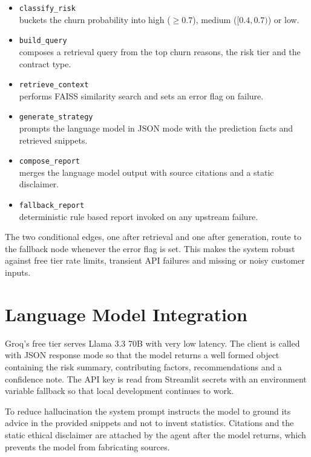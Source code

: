 \documentclass[conference]{IEEEtran}
\begin{document}
\begin{itemize}
    \setlength{\itemsep}{3pt}
    \item \texttt{classify\_risk} \\ buckets the churn probability into high (\(\geq 0.7\)), medium (\([0.4, 0.7)\)) or low.
    \item \texttt{build\_query} \\ composes a retrieval query from the top churn reasons, the risk tier and the contract type.
    \item \texttt{retrieve\_context} \\ performs FAISS similarity search and sets an error flag on failure.
    \item \texttt{generate\_strategy} \\ prompts the language model in JSON mode with the prediction facts and retrieved snippets.
    \item \texttt{compose\_report} \\ merges the language model output with source citations and a static disclaimer.
    \item \texttt{fallback\_report} \\ deterministic rule based report invoked on any upstream failure.
\end{itemize}

The two conditional edges, one after retrieval and one after generation, route to the fallback node whenever the error flag is set. This makes the system robust against free tier rate limits, transient API failures and missing or noisy customer inputs.

\section{Language Model Integration}
Groq's free tier serves Llama 3.3 70B with very low latency. The client is called with JSON response mode so that the model returns a well formed object containing the risk summary, contributing factors, recommendations and a confidence note. The API key is read from Streamlit secrets with an environment variable fallback so that local development continues to work.

To reduce hallucination the system prompt instructs the model to ground its advice in the provided snippets and not to invent statistics. Citations and the static ethical disclaimer are attached by the agent after the model returns, which prevents the model from fabricating sources.
\end{document}

